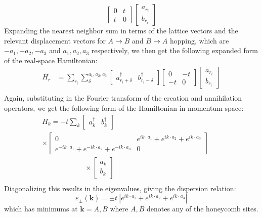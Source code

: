 \documentclass[10pt,a4paper]{article}\usepackage[]{graphicx}\usepackage[]{color}
\begin{document}
\begin{multicols}{2}
$$\begin{bmatrix}
0& t\\
t & 0
\end{bmatrix}
\begin{bmatrix}
a_{r_i} \\ b_{r_i}
\end{bmatrix}
$$
Expanding the nearest neighbor sum in terms of the lattice vectors and the relevant displacement vectors for $A\rightarrow
B$  and $B\rightarrow A$ hopping, which are $-a_1,-a_2,-a_3$ and $a_1,a_2,a_3$ respectively, we then get the following expanded form of the real-space Hamiltonian:
\begin{align*}
H_r &= 
\sum_{r_i}\sum_{\delta}^{a_1,a_2,a_3}
\begin{bmatrix}
a^{\dagger}_{r_i+\delta} & b^{\dagger}_{r_i-\delta}
\end{bmatrix}
\begin{bmatrix}
0& -t\\
-t & 0
\end{bmatrix}
\begin{bmatrix}
a_{r_i} \\ b_{r_i}
\end{bmatrix}\\
\end{align*}
Again, substituting in the Fourier transform of the creation and annihilation operators, we get the following form of the Hamiltonian in momentum-space:
\small
\hspace{-1.5cm}
\begin{align*}
H_k = 
-t\sum_{k}
\begin{bmatrix}
a^{\dagger}_{k} &b^{\dagger}_{k}
\end{bmatrix} 
\quad\quad\quad\quad\quad\quad\quad\quad\quad
\quad\quad\quad\quad\quad\quad
\\ \times
\begin{bmatrix}
0& e^{ik\cdot a_1}+e^{ik\cdot a_2}+e^{ik\cdot a_3}\\
e^{-ik\cdot a_1}+e^{-ik\cdot a_2}+e^{-ik\cdot a_3} & 0
\end{bmatrix} \\
\quad\quad\quad\quad\quad\quad
\times\begin{bmatrix}
a_{k} \\ b_{k}
\end{bmatrix}\\
\end{align*}
\normalsize
Diagonalizing this results in the eigenvalues, giving the dispersion relation:
$$
\varepsilon_{\pm}(\mathbf{k})=\pm t\ |e^{ik\cdot a_1}+e^{ik\cdot a_2}+e^{ik\cdot a_3}|
$$
which has minimums at $\mathbf{k}=A,B$ where $A,B$ denotes any of the honeycomb sites.


\end{multicols}
\end{document}
